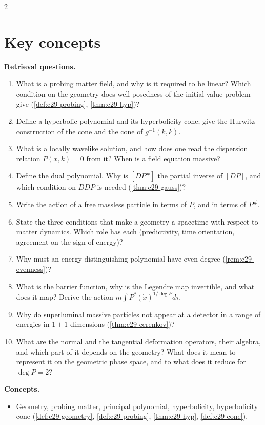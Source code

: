 \begin{paracol}{2}
\section*{Key concepts}
\begin{keyconcepts}
\textbf{Retrieval questions.}
\begin{enumerate}
  \item What is a probing matter field, and why is it required to be linear? Which condition on the geometry does well-posedness of the initial value problem give (\cref{def:c29-probing}, \cref{thm:c29-hyp})?
  \item Define a hyperbolic polynomial and its hyperbolicity cone; give the Hurwitz construction of the cone and the cone of $g^{-1}(k,k)$.
  \item What is a locally wavelike solution, and how does one read the dispersion relation $P(x,k)=0$ from it? When is a field equation massive?
  \item Define the dual polynomial. Why is $[DP^\#]$ the partial inverse of $[DP]$, and which condition on $DDP$ is needed (\cref{thm:c29-gauss})?
  \item Write the action of a free massless particle in terms of $P$, and in terms of $P^\#$.
  \item State the three conditions that make a geometry a spacetime with respect to matter dynamics. Which role has each (predictivity, time orientation, agreement on the sign of energy)?
  \item Why must an energy-distinguishing polynomial have even degree (\cref{rem:c29-evenness})?
  \item What is the barrier function, why is the Legendre map invertible, and what does it map? Derive the action $m\int P^*(\dot x)^{1/\deg P}d\tau$.
  \item Why do superluminal massive particles not appear at a detector in a range of energies in $1+1$ dimensions (\cref{thm:c29-cerenkov})?
  \item What are the normal and the tangential deformation operators, their algebra, and which part of it depends on the geometry? What does it mean to represent it on the geometric phase space, and to what does it reduce for $\deg P=2$?
\end{enumerate}
\textbf{Concepts.}
\begin{itemize}
  \item Geometry, probing matter, principal polynomial, hyperbolicity, hyperbolicity cone (\cref{def:c29-geometry}, \cref{def:c29-probing}, \cref{thm:c29-hyp}, \cref{def:c29-cone}).

\end{itemize}
\end{keyconcepts}
\end{paracol}
